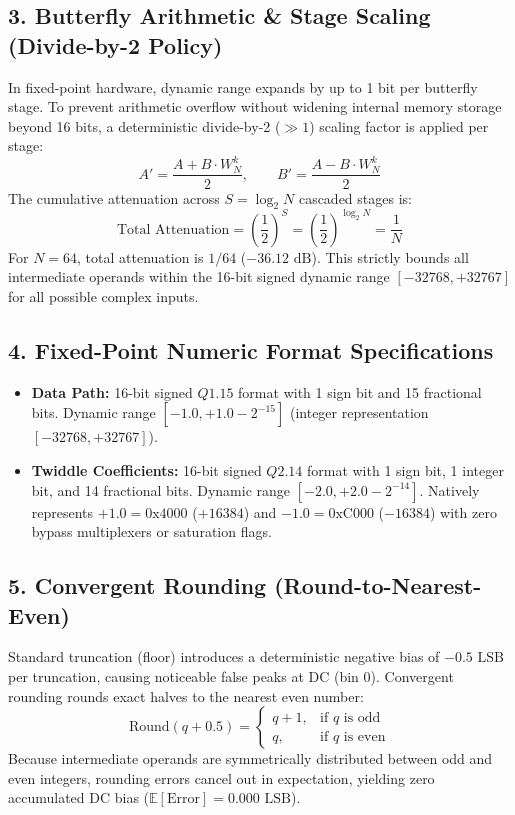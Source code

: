 \documentclass[10pt,a4paper]{article}
\begin{document}
\subsection*{3. Butterfly Arithmetic \& Stage Scaling (Divide-by-2 Policy)}
In fixed-point hardware, dynamic range expands by up to 1 bit per butterfly stage. To prevent arithmetic overflow without widening internal memory storage beyond 16 bits, a deterministic divide-by-2 ($\gg 1$) scaling factor is applied per stage:
\begin{equation}
A' = \frac{A + B \cdot W_N^k}{2}, \qquad B' = \frac{A - B \cdot W_N^k}{2}
\end{equation}
The cumulative attenuation across $S = \log_2 N$ cascaded stages is:
\begin{equation}
\text{Total Attenuation} = \left(\frac{1}{2}\right)^S = \left(\frac{1}{2}\right)^{\log_2 N} = \frac{1}{N}
\end{equation}
For $N = 64$, total attenuation is $1/64$ ($-36.12\text{ dB}$). This strictly bounds all intermediate operands within the 16-bit signed dynamic range $[-32768, +32767]$ for all possible complex inputs.

\subsection*{4. Fixed-Point Numeric Format Specifications}
\begin{itemize}
    \item \textbf{Data Path:} 16-bit signed $Q1.15$ format with 1 sign bit and 15 fractional bits. Dynamic range $[-1.0, +1.0 - 2^{-15}]$ (integer representation $[-32768, +32767]$).
    \item \textbf{Twiddle Coefficients:} 16-bit signed $Q2.14$ format with 1 sign bit, 1 integer bit, and 14 fractional bits. Dynamic range $[-2.0, +2.0 - 2^{-14}]$. Natively represents $+1.0 = \text{0x4000}$ ($+16384$) and $-1.0 = \text{0xC000}$ ($-16384$) with zero bypass multiplexers or saturation flags.
\end{itemize}

\subsection*{5. Convergent Rounding (Round-to-Nearest-Even)}
Standard truncation (floor) introduces a deterministic negative bias of $-0.5\text{ LSB}$ per truncation, causing noticeable false peaks at DC (bin 0). Convergent rounding rounds exact halves to the nearest even number:
\begin{equation}
\text{Round}(q + 0.5) = \begin{cases} q + 1, & \text{if } q \text{ is odd} \\ q, & \text{if } q \text{ is even} \end{cases}
\end{equation}
Because intermediate operands are symmetrically distributed between odd and even integers, rounding errors cancel out in expectation, yielding zero accumulated DC bias ($\mathbb{E}[\text{Error}] = 0.000\text{ LSB}$).
\end{document}
